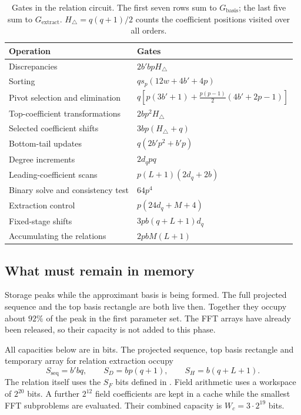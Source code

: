 \documentclass[b5paper, 10pt, abstract=true, captions=tableheading]{scrartcl}
\theoremstyle{plain}
\theoremstyle{definition}
\begin{document}
\begin{table}[htbp]\centering\small
\caption{Gates in the relation circuit. The first seven rows sum to
$G_{\mathrm{basis}}$; the last five sum to $G_{\mathrm{extract}}$.
$H_{\triangle}=q(q+1)/2$ counts the coefficient positions visited over all
orders.}
\label{tab:wopt-generator-gates}
\begin{tabular}{@{}ll@{}}
\toprule Operation & Gates\\\midrule
Discrepancies & $2b'bpH_{\triangle}$\\
Sorting & $qs_p(12w+4b'+4p)$\\
Pivot selection and elimination & $q[p(3b'+1)+\tfrac{p(p-1)}2(4b'+2p-1)]$\\
Top-coefficient transformations & $2bp^2H_{\triangle}$\\
Selected coefficient shifts & $3bp(H_{\triangle}+q)$\\
Bottom-tail updates & $q(2b'p^2+b'p)$\\
Degree increments & $2d_qpq$\\\midrule
Leading-coefficient scans & $p(L+1)(2d_q+2b)$\\
Binary solve and consistency test & $64p^4$\\
Extraction control & $p(24d_q+M+4)$\\
Fixed-stage shifts & $3pb(q+L+1)d_q$\\
Accumulating the relations & $2pbM(L+1)$\\\bottomrule
\end{tabular}
\end{table}

\subsection{What must remain in memory}
\label{sec:wopt-storage}
Storage peaks while the approximant basis is being formed. The full
projected sequence and the top basis rectangle are both live then.
Together they occupy about $92\%$ of the peak in the first parameter set.
The FFT arrays have already been released, so their capacity
is not added to this phase.

All capacities below are in bits. The projected sequence, top basis
rectangle and temporary array for relation extraction occupy
\[
 S_{\mathrm{seq}}=b' bq,\qquad S_D=bp(q+1),\qquad S_H=b(q+L+1).
\]
The relation itself uses the $S_F$ bits defined in
. Field arithmetic uses a workspace of
$2^{20}$ bits. A further $2^{12}$ field coefficients are kept in a cache
while the smallest FFT subproblems are evaluated. Their combined capacity
is $W_c=3\cdot2^{19}$ bits.
\end{document}
